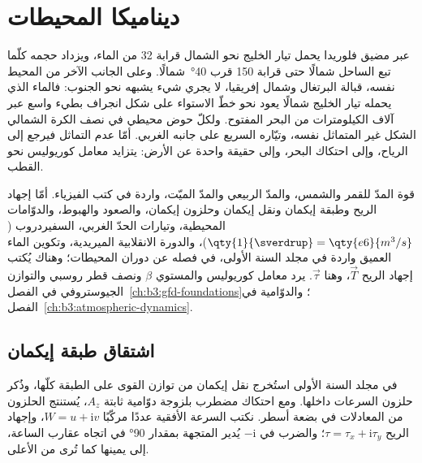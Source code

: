 \chapter{ديناميكا المحيطات}\label{ch:b3:ocean-dynamics}

عبر مضيق فلوريدا يحمل تيار الخليج نحو الشمال قرابة
\qty{32}{\sverdrup} من الماء، ويزداد حجمه كلّما تبع الساحل
شمالًا حتى قرابة \qty{150}{\sverdrup} قرب \ang{40}~شمالًا. وعلى الجانب الآخر من المحيط نفسه، قبالة البرتغال وشمال
إفريقيا، لا يجري شيء يشبهه نحو الجنوب: فالماء الذي يحمله تيار الخليج
شمالًا يعود نحو خطّ الاستواء على شكل انجراف بطيء واسع عبر آلاف
الكيلومترات من البحر المفتوح. ولكلّ حوض محيطي في نصف الكرة الشمالي
الشكل غير المتماثل نفسه، وتيّاره السريع على جانبه الغربي. أمّا
عدم التماثل فيرجع إلى الرياح، وإلى احتكاك البحر، وإلى حقيقة واحدة
عن الأرض: يتزايد معامل كوريوليس نحو القطب.

\begin{recall}
قوة المدّ للقمر والشمس، والمدّ الربيعي والمدّ الميّت، واردة في
كتب الفيزياء. أمّا إجهاد الريح وطبقة إيكمان ونقل إيكمان
وحلزون إيكمان، والصعود والهبوط، والدوّامات المحيطية، وتيارات الحدّ الغربي،
السفيردروب ($\qty{1}{\sverdrup} =
\qty{e6}{m^3/s}$)، والدورة الانقلابية الميريدية،
وتكوين الماء العميق واردة في مجلد السنة الأولى، في فصله عن
دوران المحيطات؛ وهناك يُكتب إجهاد الريح $\vec T$، وهنا
$\vec\tau$. يرد معامل كوريوليس والمستوي $\beta$ ونصف قطر روسبي
والتوازن الجيوستروفي في الفصل~\ref{ch:b3:gfd-foundations}؛
والدوّامية  في الفصل~\ref{ch:b3:atmospheric-dynamics}.
\end{recall}

\section{اشتقاق طبقة إيكمان}\label{sec:b3:ocean-dynamics:ekman}

في مجلد السنة الأولى استُخرج نقل إيكمان من توازن القوى
على الطبقة كلّها، وذُكر حلزون السرعات داخلها. ومع
احتكاك مضطرب بلزوجة دوّامية ثابتة $A_z$، يُستنتج الحلزون
من المعادلات في بضعة أسطر. نكتب السرعة الأفقية عددًا
مركّبًا $W = u + \mathrm iv$، وإجهاد الريح $\tau =
\tau_x + \mathrm i\tau_y$؛ والضرب في $-\mathrm i$ يُدير المتجهة
بمقدار \ang{90} في اتجاه عقارب الساعة، إلى يمينها كما تُرى من الأعلى.

